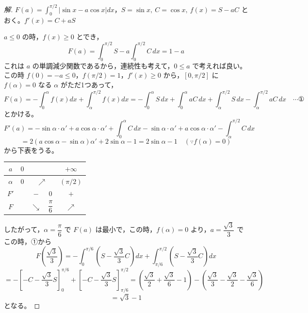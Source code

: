 \documentclass[../main.tex]{subfiles}
\begin{document}
\begin{proof}[解]
  $F(a)=\displaystyle\int_0^{\pi/2}|\sin x-a\cos x|dx$，$S=\sin x,\ C=\cos x,\ f(x)=S-aC$ とおく。$f'(x)=C+aS$

  $a\le0$ の時，$f(x)\ge0$ とでき，
  \[
    F(a)=\int_0^{\pi/2}S-a\int_0^{\pi/2}C\,dx=1-a
  \]
  これは $a$ の単調減少関数であるから，連続性も考えて，$0\le a$ で考えれば良い。この時
  $f(0)=-a\le0$，$f(\pi/2)=1$，$f'(x)\ge0$ から，$[0,\pi/2]$ に $f(\alpha)=0$ なる $\alpha$ がただ1つあって，
  \[
    F(a)=-\int_0^\alpha f(x)dx+\int_\alpha^{\pi/2}f(x)dx
    = -\int_0^\alpha S\,dx+\int_0^\alpha aC\,dx+\int_\alpha^{\pi/2}S\,dx-\int_\alpha^{\pi/2}aC\,dx \quad \cdots \text{①}
  \]
  とかける。
  \[
    F'(a) = -\sin\alpha\cdot\alpha'+a\cos\alpha\cdot\alpha'+\int_0^\alpha C\,dx-\sin\alpha\cdot\alpha'+a\cos\alpha\cdot\alpha'-\int_\alpha^{\pi/2}C\,dx
  \]
  \[
    =2(a\cos\alpha-\sin\alpha)\alpha'+2\sin\alpha-1 = 2\sin\alpha-1 \quad (\because f(\alpha)=0)
  \]
  から下表をうる。

  \begin{center}
    \begin{tabular}{c|c|c|c|c}
      $a$ & $0$ & & & $+\infty$ \\
      \hline
      $\alpha$ & $0$ & \multicolumn{2}{c|}{$\nearrow$} & $(\pi/2)$ \\
      \hline
      $F'$ & & $-$ & $0$ & $+$ \\
      \hline
      $F$ & & $\searrow$ & $\dfrac{\pi}{6}$ & $\nearrow$
    \end{tabular}
  \end{center}

  したがって，$\alpha=\dfrac{\pi}{6}$ で $F(a)$ は最小で，この時，$f(\alpha)=0$ より，$a=\dfrac{\sqrt3}{3}$ でこの時，①から
  \[
    F\left(\frac{\sqrt3}{3}\right) = -\int_0^{\pi/6}\left(S-\frac{\sqrt3}{3}C\right)dx+\int_{\pi/6}^{\pi/2}\left(S-\frac{\sqrt3}{3}C\right)dx
  \]
  \[
    = -\left[-C-\frac{\sqrt3}{3}S\right]_0^{\pi/6}+\left[-C-\frac{\sqrt3}{3}S\right]_{\pi/6}^{\pi/2}
    = \left(\frac{\sqrt3}{2}+\frac{\sqrt3}{6}-1\right)-\left(\frac{\sqrt3}{3}-\frac{\sqrt3}{2}-\frac{\sqrt3}{6}\right)
  \]
  \[
    = \sqrt3-1
  \]
  となる。
\end{proof}
\end{document}
